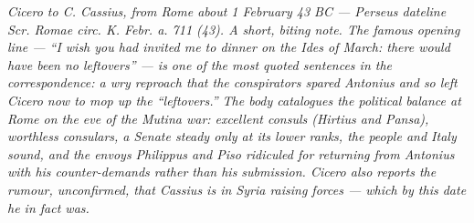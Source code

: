 
\textit{Cicero to C. Cassius, from Rome about 1 February 43 BC ---
Perseus dateline \textit{Scr. Romae circ. K. Febr. a. 711 (43)}.
A short, biting note. The famous opening line --- ``I wish you had
invited me to dinner on the Ides of March: there would have been no
leftovers'' --- is one of the most quoted sentences in the
correspondence: a wry reproach that the conspirators spared Antonius
and so left Cicero now to mop up the ``leftovers.'' The body
catalogues the political balance at Rome on the eve of the Mutina
war: excellent consuls (Hirtius and Pansa), worthless consulars, a
Senate steady only at its lower ranks, the people and Italy sound,
and the envoys Philippus and Piso ridiculed for returning from
Antonius with his counter-demands rather than his submission. Cicero
also reports the rumour, unconfirmed, that Cassius is in Syria
raising forces --- which by this date he in fact was.}
